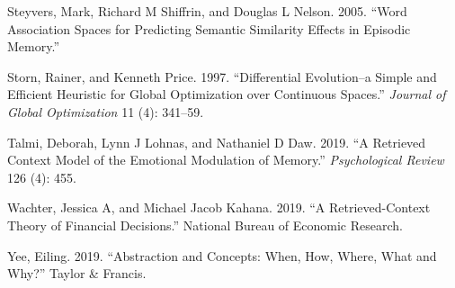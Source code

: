 \documentclass[
  letterpaper,
  DIV=11]{article}
\newlength{\cslhangindent}
\newlength{\cslentryspacingunit} %
\newenvironment{CSLReferences}[2] %
 {%
  \setlength{\parindent}{0pt}
  \ifodd #1
  \let\oldpar\par
  \def\par{\hangindent=\cslhangindent\oldpar}
  \fi
  \setlength{\parskip}{#2\cslentryspacingunit}
 }%
 {}
\begin{document}
\begin{CSLReferences}{1}{0}
\leavevmode{}%
Steyvers, Mark, Richard M Shiffrin, and Douglas L Nelson. 2005. {``Word
Association Spaces for Predicting Semantic Similarity Effects in
Episodic Memory.''}

\leavevmode{}%
Storn, Rainer, and Kenneth Price. 1997. {``Differential Evolution--a
Simple and Efficient Heuristic for Global Optimization over Continuous
Spaces.''} \emph{Journal of Global Optimization} 11 (4): 341--59.

\leavevmode{}%
Talmi, Deborah, Lynn J Lohnas, and Nathaniel D Daw. 2019. {``A Retrieved
Context Model of the Emotional Modulation of Memory.''}
\emph{Psychological Review} 126 (4): 455.

\leavevmode{}%
Wachter, Jessica A, and Michael Jacob Kahana. 2019. {``A
Retrieved-Context Theory of Financial Decisions.''} National Bureau of
Economic Research.

\leavevmode{}%
Yee, Eiling. 2019. {``Abstraction and Concepts: When, How, Where, What
and Why?''} Taylor \& Francis.

\end{CSLReferences}
\end{document}
